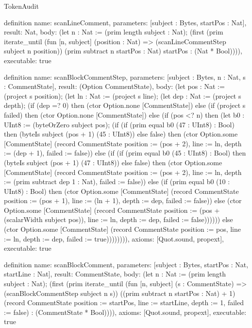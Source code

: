 \begin{lexlean}{TokenAudit}
\begin{semanticmodule}
definition{
  name: scanLineComment,
  parameters: [subject : Bytes, startPos : Nat],
  result: Nat,
  body: (let n : Nat := (prim length subject : Nat); (first (prim iterate_until (fun [n, subject] (position : Nat) => (scanLineCommentStep subject n position)) (prim subtract n startPos : Nat) startPos : (Nat * Bool)))),
  executable: true
}

definition{
  name: scanBlockCommentStep,
  parameters: [subject : Bytes, n : Nat, s : CommentState],
  result: (Option CommentState),
  body: (let pos : Nat := (project s position); (let ln : Nat := (project s line); (let dep : Nat := (project s depth); (if (dep =? 0) then (ctor Option.none [CommentState]) else (if (project s failed) then (ctor Option.none [CommentState]) else (if (pos <? n) then (let b0 : UInt8 := (byteOrZero subject pos); (if (if (prim equal b0 (47 : UInt8) : Bool) then (byteIs subject (pos + 1) (45 : UInt8)) else false) then (ctor Option.some [CommentState] (record CommentState {position := (pos + 2), line := ln, depth := (dep + 1), failed := false})) else (if (if (prim equal b0 (45 : UInt8) : Bool) then (byteIs subject (pos + 1) (47 : UInt8)) else false) then (ctor Option.some [CommentState] (record CommentState {position := (pos + 2), line := ln, depth := (prim subtract dep 1 : Nat), failed := false})) else (if (prim equal b0 (10 : UInt8) : Bool) then (ctor Option.some [CommentState] (record CommentState {position := (pos + 1), line := (ln + 1), depth := dep, failed := false})) else (ctor Option.some [CommentState] (record CommentState {position := (pos + (scalarWidth subject pos)), line := ln, depth := dep, failed := false})))))) else (ctor Option.some [CommentState] (record CommentState {position := pos, line := ln, depth := dep, failed := true})))))))),
  axioms: [Quot.sound, propext],
  executable: true
}

definition{
  name: scanBlockComment,
  parameters: [subject : Bytes, startPos : Nat, startLine : Nat],
  result: CommentState,
  body: (let n : Nat := (prim length subject : Nat); (first (prim iterate_until (fun [n, subject] (s : CommentState) => (scanBlockCommentStep subject n s)) ((prim subtract n startPos : Nat) + 1) (record CommentState {position := startPos, line := startLine, depth := 1, failed := false}) : (CommentState * Bool)))),
  axioms: [Quot.sound, propext],
  executable: true
}


\end{semanticmodule}
\end{lexlean}
